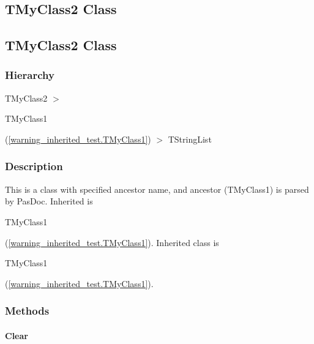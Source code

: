 \documentclass{report}
\begin{document}
\subsection*{\large{\textbf{TMyClass2 Class}}\normalsize\hspace{1ex}\hrulefill}
\else
\subsection*{TMyClass2 Class}
\fi
\label{warning_inherited_test.TMyClass2}
\subsubsection*{\large{\textbf{Hierarchy}}\normalsize\hspace{1ex}\hfill}
TMyClass2 {$>$} \begin{ttfamily}TMyClass1\end{ttfamily}(\ref{warning_inherited_test.TMyClass1}) {$>$} 
TStringList
\subsubsection*{\large{\textbf{Description}}\normalsize\hspace{1ex}\hfill}
This is a class with specified ancestor name, and ancestor (TMyClass1) is parsed by PasDoc. Inherited is \begin{ttfamily}TMyClass1\end{ttfamily}(\ref{warning_inherited_test.TMyClass1}). Inherited class is \begin{ttfamily}TMyClass1\end{ttfamily}(\ref{warning_inherited_test.TMyClass1}).\subsubsection*{\large{\textbf{Methods}}\normalsize\hspace{1ex}\hfill}
\paragraph*{Clear}\hspace*{\fill}
\end{document}
